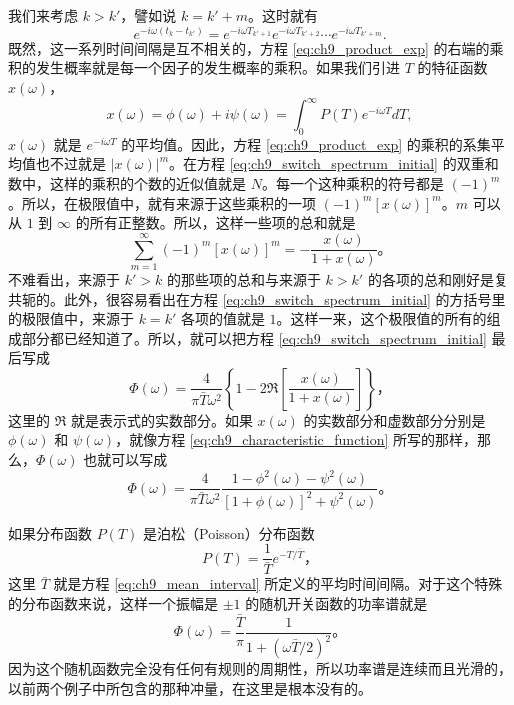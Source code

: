 我们来考虑 $k>k'$，譬如说 $k=k'+m$。这时就有
\begin{equation}\label{eq:ch9_product_exp}
e^{-i\omega (t_k-t_{k'})} = e^{-i\omega T_{k'+1}} e^{-i\omega T_{k'+2}} \cdots e^{-i\omega T_{k'+m}}.
\end{equation}
既然，这一系列时间间隔是互不相关的，方程 \eqref{eq:ch9_product_exp} 的右端的乘积的发生概率就是每一个因子的发生概率的乘积。如果我们引进 $T$ 的特征函数 $x(\omega)$，
\begin{equation}\label{eq:ch9_characteristic_function}
x(\omega) = \phi(\omega) + i\psi(\omega) = \int_0^\infty P(T)e^{-i\omega T}dT,
\end{equation}
$x(\omega)$ 就是 $e^{-i\omega T}$ 的平均值。因此，方程 \eqref{eq:ch9_product_exp} 的乘积的系集平均值也不过就是 $|x(\omega)|^m$。在方程 \eqref{eq:ch9_switch_spectrum_initial} 的双重和数中，这样的乘积的个数的近似值就是 $N$。每一个这种乘积的符号都是 $(-1)^m$。所以，在极限值中，就有来源于这些乘积的一项 $(-1)^m[x(\omega)]^m$。$m$ 可以从 $1$ 到 $\infty$ 的所有正整数。所以，这样一些项的总和就是
\begin{equation*}
\sum_{m=1}^\infty (-1)^m [x(\omega)]^m = -\frac{x(\omega)}{1+x(\omega)}。
\end{equation*}
不难看出，来源于 $k' > k$ 的那些项的总和与来源于 $k > k'$ 的各项的总和刚好是复共轭的。此外，很容易看出在方程 \eqref{eq:ch9_switch_spectrum_initial} 的方括号里的极限值中，来源于 $k=k'$ 各项的值就是 $1$。这样一来，这个极限值的所有的组成部分都已经知道了。所以，就可以把方程 \eqref{eq:ch9_switch_spectrum_initial} 最后写成
\begin{equation*}
\Phi(\omega) = \frac{4}{\pi \bar{T} \omega^2} \left\{ 1 - 2\Re\left[\frac{x(\omega)}{1+x(\omega)}\right] \right\}，
\end{equation*}
这里的 $\Re$ 就是表示式的实数部分。如果 $x(\omega)$ 的实数部分和虚数部分分别是 $\phi(\omega)$ 和 $\psi(\omega)$，就像方程 \eqref{eq:ch9_characteristic_function} 所写的那样，那么，$\Phi(\omega)$ 也就可以写成
\begin{equation}\label{eq:ch9_switch_spectrum_final}
\Phi(\omega) = \frac{4}{\pi \bar{T} \omega^2} \frac{1-\phi^2(\omega)-\psi^2(\omega)}{[1+\phi(\omega)]^2+\psi^2(\omega)}。
\end{equation}

如果分布函数 $P(T)$ 是泊松（Poisson）分布函数
\begin{equation}\label{eq:ch9_poisson_dist}
P(T) = \frac{1}{\bar{T}} e^{-T/\bar{T}}，
\end{equation}
这里 $\bar{T}$ 就是方程 \eqref{eq:ch9_mean_interval} 所定义的平均时间间隔。对于这个特殊的分布函数来说，这样一个振幅是 $\pm 1$ 的随机开关函数的功率谱就是
\begin{equation}\label{eq:ch9_poisson_spectrum}
\Phi(\omega) = \frac{\bar{T}}{\pi} \frac{1}{1+(\omega \bar{T}/2)^2}。
\end{equation}
因为这个随机函数完全没有任何有规则的周期性，所以功率谱是连续而且光滑的，以前两个例子中所包含的那种冲量，在这里是根本没有的。

